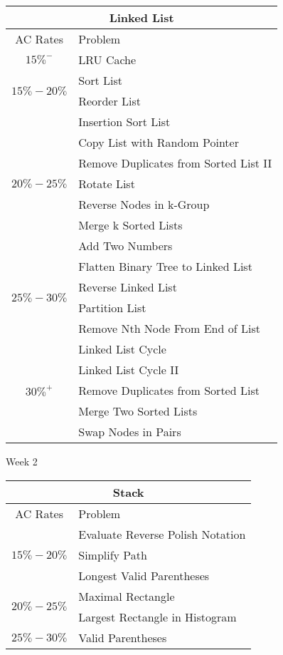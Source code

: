 \documentclass[paper=a4, fontsize=11pt]{scrartcl} %
\begin{document}
\begin{center}
  \begin{tabular}{|c|l|}
      \hline
      \multicolumn{2}{|c|}{Linked List} \\
      \hline
      AC Rates      &   Problem     \\
      \hline
      \multirow{1}{*}{$15\%^-$}  &   LRU Cache    \\
      \hline
      \multirow{2}{*}{$15\%-20\%$}  &   Sort List    \\
          & Reorder List    \\
      \hline
      \multirow{7}{*}{$20\%-25\%$}  &   Insertion Sort List    \\
          & Copy List with Random Pointer    \\
          & Remove Duplicates from Sorted List II \\
          & Rotate List \\
          & Reverse Nodes in k-Group    \\
          & Merge k Sorted Lists \\
          & Add Two Numbers \\
      \hline
      \multirow{4}{*}{$25\%-30\%$}  &   Flatten Binary Tree to Linked List    \\
          & Reverse Linked List \\
          & Partition List  \\
          & Remove Nth Node From End of List \\
      \hline
      \multirow{5}{*}{$30\%^+$}  &   Linked List Cycle    \\
          & Linked List Cycle II    \\
          & Remove Duplicates from Sorted List \\
          & Merge Two Sorted Lists \\
          & Swap Nodes in Pairs \\
      \hline
  \end{tabular}

  \pagebreak

  \begin{center}
    Week 2
  \end{center}

  \begin{tabular}{|c|l|}
      \hline
      \multicolumn{2}{|c|}{Stack} \\
      \hline
      AC Rates      &   Problem     \\
      \hline
      \multirow{3}{*}{$15\%-20\%$}  &    Evaluate Reverse Polish Notation    \\
          & Simplify Path    \\
          & Longest Valid Parentheses    \\
      \hline
      \multirow{2}{*}{$20\%-25\%$}  &   Maximal Rectangle    \\
          & Largest Rectangle in Histogram    \\
      \hline
      \multirow{1}{*}{$25\%-30\%$}  &   Valid Parentheses \\
      \hline
  \end{tabular}


\end{center}
\end{document}
